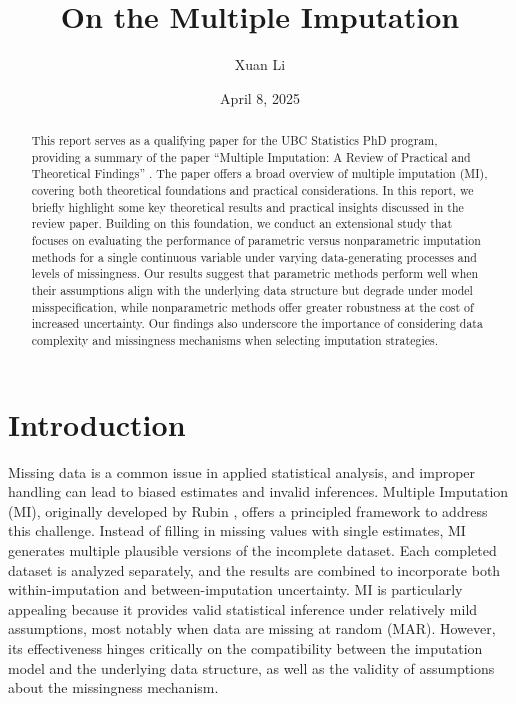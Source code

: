 \documentclass[12pt,oneside]{amsart}
\title{On the Multiple Imputation}
\author{Xuan Li}
\date{April 8, 2025}
\theoremstyle{definition}
\theoremstyle{remark}
\numberwithin{equation}{section}
\begin{document}
\begin{abstract}
    This report serves as a qualifying paper for the UBC Statistics PhD program, providing a summary of the paper “Multiple Imputation: A Review of Practical and Theoretical Findings” \citep{qp}. The paper offers a broad overview of multiple imputation (MI), covering both theoretical foundations and practical considerations. In this report, we briefly highlight some key theoretical results and practical insights discussed in the review paper. Building on this foundation, we conduct an extensional study that focuses on evaluating the performance of parametric versus nonparametric imputation methods for a single continuous variable under varying data-generating processes and levels of missingness. Our results suggest that parametric methods perform well when their assumptions align with the underlying data structure but degrade under model misspecification, while nonparametric methods offer greater robustness at the cost of increased uncertainty. Our findings also underscore the importance of considering data complexity and missingness mechanisms when selecting imputation strategies.
\end{abstract}
\maketitle
\tableofcontents



\section{Introduction}
Missing data is a common issue in applied statistical analysis, and improper handling can lead to biased estimates and invalid inferences. Multiple Imputation (MI), originally developed by Rubin \citep{rubin}, offers a principled framework to address this challenge. Instead of filling in missing values with single estimates, MI generates multiple plausible versions of the incomplete dataset. Each completed dataset is analyzed separately, and the results are combined to incorporate both within-imputation and between-imputation uncertainty. MI is particularly appealing because it provides valid statistical inference under relatively mild assumptions, most notably when data are missing at random (MAR). However, its effectiveness hinges critically on the compatibility between the imputation model and the underlying data structure, as well as the validity of assumptions about the missingness mechanism.
\end{document}
